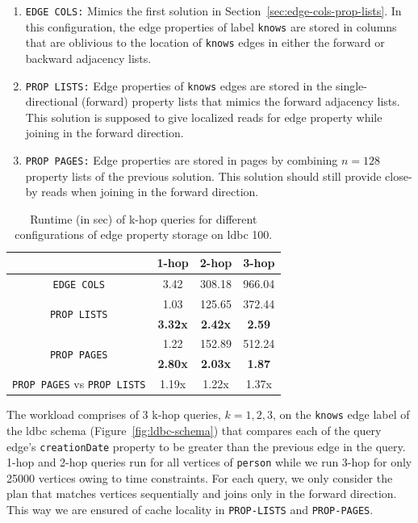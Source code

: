 \begin{enumerate}
	\item \texttt{EDGE COLS:} Mimics the first solution in Section~\ref{sec:edge-cols-prop-lists}. In this configuration, the edge properties of label \texttt{knows} are stored in columns that are oblivious to the location of \texttt{knows} edges in either the forward or backward adjacency lists. 
	\item \texttt{PROP LISTS:} Edge properties of \texttt{knows} edges are stored in the single-directional (forward) property lists that mimics the forward adjacency lists. This solution is supposed to give localized reads for edge property while joining in the forward direction.
	\item \texttt{PROP PAGES:} Edge properties are stored in pages by combining $n=128$ property lists of the previous solution. This solution should still provide close-by reads when joining in the forward direction.
\end{enumerate}

\begin{table}
	\centering
	\bgroup
	\setlength{\tabcolsep}{8pt}
	\def\arraystretch{1.2}%
	\begin{tabular}{ |c|c|c|c| } 
		\hline
		& \textbf{1-hop} & \textbf{2-hop} & \textbf{3-hop} \\
		\hline \hline
		\texttt{EDGE COLS}& 3.42 & 308.18 & 966.04\\ 
		\hline
		\multirow{2}{*}{\texttt{PROP LISTS}}& 1.03 & 125.65 & 372.44 \\ 
		& \textbf{3.32x} & \textbf{2.42x} & \textbf{2.59}\\ 
		\hline 
		\multirow{2}{*}{\texttt{PROP PAGES}} & 1.22 & 152.89 & 512.24 \\ 
		& \textbf{2.80x} & \textbf{2.03x} & \textbf{1.87} \\ 
		\hline \hline
		\texttt{PROP PAGES} vs \texttt{PROP LISTS} & 1.19x & 1.22x & 1.37x \\
		\hline
	\end{tabular}
	\egroup
	\captionsetup{justification=centering}
	\caption{Runtime (in sec) of k-hop queries for different configurations of edge property storage on \gls{ldbc} 100.}
	\label{tbl:mem2}
\end{table}

The workload comprises of 3 k-hop queries, $k=1,2,3$, on the \texttt{knows} edge label of the \gls{ldbc} schema (Figure~\ref{fig:ldbc-schema}) that compares each of the query edge's \texttt{creationDate} property to be greater than the previous edge in the query. 1-hop and 2-hop queries run for all vertices of \texttt{person} while we run 3-hop for only 25000 vertices owing to time constraints. For each query, we only consider the plan that matches vertices sequentially and joins only in the forward direction. This way we are ensured of cache locality in \texttt{PROP-LISTS} and \texttt{PROP-PAGES}.

